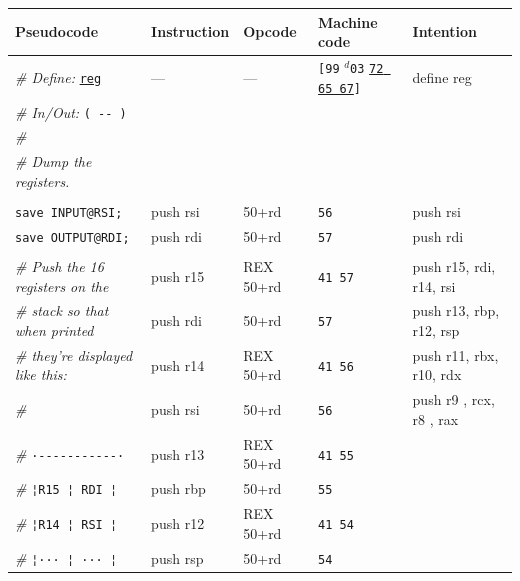 \documentclass[a4paper,12pt,final]{article}
\begin{document}
\begin{table}[!htbp] \begin{adjustwidth}{-1cm}{-1cm} \fontsize{10}{12.000000}\selectfont
\begin{center}
\begin{tabular}{l|ll|lH}
\textbf{Pseudocode} & \textbf{Instruction} & \textbf{Opcode} & \textbf{Machine code} & \textbf{Intention}\\[0pt]
\hline
\emph{\# Define:} \uline{\texttt{reg}} & --- & --- & \texttt{[99} \(^{d}\)​\texttt{03} \uline{\texttt{72 65 67}}​\texttt{]} & define reg\\[0pt]
\emph{\# In/Out:} \texttt{( -​- )} &  &  &  & \\[0pt]
\emph{\#} &  &  &  & \\[0pt]
\emph{\# Dump the registers.} &  &  &  & \\[0pt]
 &  &  &  & \\[0pt]
\texttt{save INPUT@RSI;} & push rsi & 50+rd & \texttt{56} & push rsi\\[0pt]
\texttt{save OUTPUT@RDI;} & push rdi & 50+rd & \texttt{57} & push rdi\\[0pt]
 &  &  &  & \\[0pt]
\emph{\# Push the 16 registers on the} & push r15 & REX 50+rd & \texttt{41 57} & push r15, rdi, r14, rsi\\[0pt]
\emph{\# stack so that when printed} & push rdi & 50+rd & \texttt{57} & push r13, rbp, r12, rsp\\[0pt]
\emph{\# they're displayed like this:} & push r14 & REX 50+rd & \texttt{41 56} & push r11, rbx, r10, rdx\\[0pt]
\emph{\#} & push rsi & 50+rd & \texttt{56} & push r9 , rcx, r8 , rax\\[0pt]
\emph{\#}\hspace{2.106000em} \texttt{·-{}-{}-{}-{}-{}-{}-{}-{}-{}-{}-·} & push r13 & REX 50+rd & \texttt{41 55} & \\[0pt]
\emph{\#}\hspace{2.106000em} \texttt{¦}​\hspace{0.526500em}​\texttt{R15 ¦ RDI ¦} & push rbp & 50+rd & \texttt{55} & \\[0pt]
\emph{\#}\hspace{2.106000em} \texttt{¦}​\hspace{0.526500em}​\texttt{R14 ¦ RSI ¦} & push r12 & REX 50+rd & \texttt{41 54} & \\[0pt]
\emph{\#}\hspace{2.106000em} \texttt{¦}​\hspace{0.526500em}​\texttt{··· ¦ ··· ¦} & push rsp & 50+rd & \texttt{54} & \\[0pt]

\end{tabular}
\end{center}
\end{adjustwidth}
\end{table}
\end{document}
